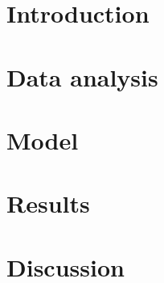 \documentclass[11pt,titlepage,a4paper]{article}
\begin{document}
    

    \tableofcontents

    \newpage
    
    \section{Introduction}\label{section_introduction}
    
    \newpage
    
    \section{Data analysis}\label{section_data_analysis}
    
    \newpage
    
    \section{Model}\label{section_model}
    
    \newpage
    
    \section{Results}\label{section_results}
    
    \newpage
    
    \section{Discussion}\label{section_discussion}
    
    \newpage
    
    \printbibliography
    \newpage
    
    \appendix
    
\end{document}
